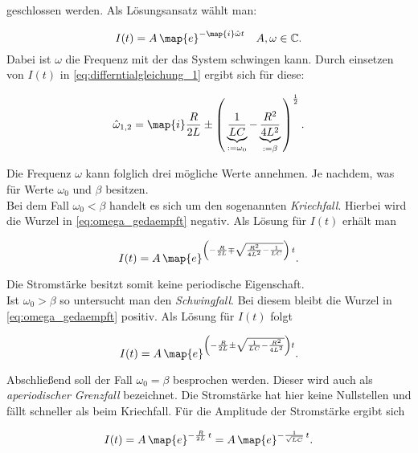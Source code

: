 geschlossen werden.
Als Lösungsansatz wählt man:

\begin{equation*}
  I(t)=A\,\map{e}^{-\map{i}\hat{\omega} t} \quad A,\omega\in\mathbb{C}.
\end{equation*}
Dabei ist $\omega$ die Frequenz mit der das System schwingen kann.
Durch einsetzen von $I(t)$ in \eqref{eq:differntialgleichung_1} ergibt sich %
für diese:

\begin{equation}
  \label{eq:omega_gedaempft}
  \hat{\omega}_{1,2}=\map{i}\frac{R}{2L}\pm\left(\,\underbrace{\frac{1}{LC}}_{:=\omega_0}-\underbrace{\frac{R^2}{4L^2}}_{:=\beta}\,\right)^{\frac{1}{2}}.
\end{equation}

 Die Frequenz $\omega$ kann folglich drei mögliche Werte annehmen.
 Je nachdem, was für Werte $\omega_0$ und $\beta$ besitzen.  %
\\

Bei dem Fall $\omega_0<\beta$ handelt es sich um den sogenannten \emph{Kriechfall}. %
 Hierbei wird die Wurzel in \eqref{eq:omega_gedaempft} negativ. Als Lösung für
 $I(t)$ erhält man

\begin{equation*}
     I(t)=A\,\map{e}^{\left(-\frac{R}{2L}\mp\sqrt{\frac{R^2}{4L^2}-\frac{1}{LC}}\right)\,t}.
\end{equation*}

Die Stromstärke besitzt somit keine periodische Eigenschaft.
\\

Ist $\omega_0>\beta$ so untersucht man den \emph{Schwingfall}. %
Bei diesem bleibt die Wurzel in \eqref{eq:omega_gedaempft} positiv. Als
Lösung für $I(t)$ folgt

\begin{equation*}
  I(t)=A\,\map{e}^{\left(-\frac{R}{2L}\pm\sqrt{{\frac{1}{LC}}-\frac{R^2}{4L^2}}\right)t}.
\end{equation*}

Abschließend soll der Fall $\omega_0=\beta$ besprochen werden.
Dieser wird auch als \emph{aperiodischer Grenzfall} bezeichnet.
Die Stromstärke hat hier keine Nullstellen und fällt schneller als
beim Kriechfall.
Für die Amplitude der Stromstärke ergibt sich

\begin{equation}
  \label{eq:ap_grenz}
  I(t)=A\,\map{e}^{-\frac{R}{2L}\,t}=A\,\map{e}^{-\frac{1}{\sqrt{LC}}\,t}.
\end{equation}

